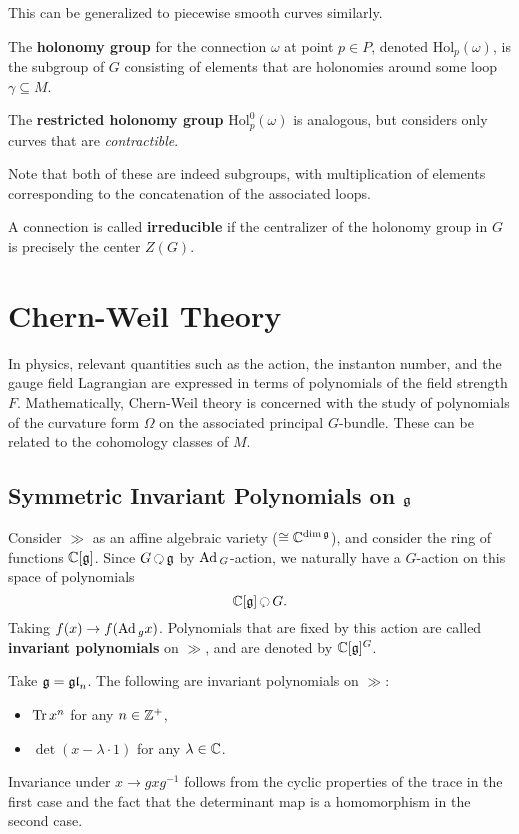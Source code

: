 		This can be generalized to piecewise smooth curves similarly.
		
		\begin{defn}
			The \textbf{holonomy group} for the connection $\omega$ at point $p \in P$, denoted $\mathrm{Hol}_p(\omega)$,  is the subgroup of $G$ consisting of elements that are holonomies around some loop $\gamma \subseteq M$.
			
			The \textbf{restricted holonomy group} $\mathrm{Hol}_p^0(\omega)$ is analogous, but considers only curves that are \emph{contractible}.
		\end{defn}
		Note that both of these are indeed subgroups, with multiplication of elements corresponding to the concatenation of the associated loops.
		
		A connection is called \textbf{irreducible} if the centralizer of the holonomy group in $G$ is precisely the center $Z(G)$.
		
		\section{Chern-Weil Theory}
		
		In physics, relevant quantities such as the action, the instanton number, and the gauge field Lagrangian are expressed in terms of polynomials of the field strength $F$. Mathematically, Chern-Weil theory is concerned with the study of polynomials of the curvature form $\Omega$ on the associated principal $G$-bundle. These can be related to the cohomology classes of $M$.
		
		\subsection{Symmetric Invariant Polynomials on $\frak g$}
		
		Consider $\gg$ as an affine algebraic variety ($\cong \mathbb{C}^{\dim \frak{g}}$), and consider the ring of functions $\mathbb{C} [\frak{g}]$. Since $G \lacts \gg$ by $\mathrm{Ad}\,_G$-action, we naturally have a $G$-action on this space of polynomials
		\[
			\cc [\gg] \racts G.
		\]
		Taking $f(x) \to f(\mathrm{Ad}\,_g x)$. Polynomials that are fixed by this action are called \textbf{invariant polynomials} on $\gg$, and are denoted by $\mathbb{C}[\frak{g}]^G$.
		
		\begin{eg}
			Take $\frak{g} = \frak{gl}_n$. The following are invariant polynomials on $\gg$:
			\begin{itemize}
				\item $\mathrm{Tr}\, x^n$ for any $n \in \mathbb{Z}^+$,
				\item $\det (x - \lambda \cdot 1)$ for any  $\lambda \in \mathbb{C}$.
			\end{itemize}
			Invariance under $x \to gxg^{-1}$ follows from the cyclic properties of the trace in the first case and the fact that the determinant map is a homomorphism in the second case.
		\end{eg}
		
